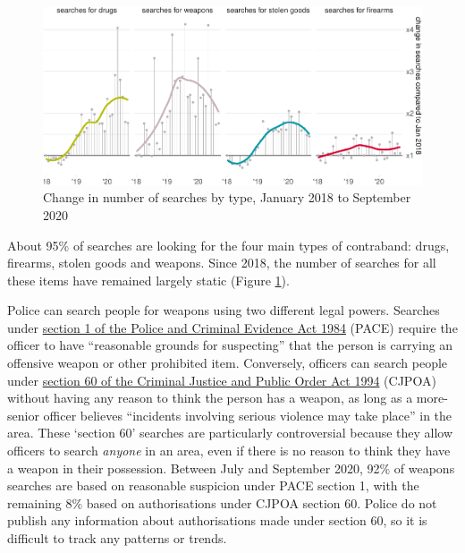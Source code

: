 \documentclass[
  a4paper,
  twoside, 11pt]{article}
\begin{document}
\begin{figure}[bh]

{\centering \includegraphics{2020-Q3_files/figure-latex/chart-search-types-change-1} 

}

\caption{Change in number of searches by type, January 2018 to September 2020}\label{fig:chart-search-types-change}
\end{figure}

About 95\% of searches are looking for the four main types of contraband: drugs, firearms, stolen goods and weapons. Since 2018, the number of searches for all these items have remained largely static (Figure \ref{fig:chart-search-types-change}).

Police can search people for weapons using two different legal powers. Searches under \href{https://www.legislation.gov.uk/ukpga/1984/60/section/1}{section 1 of the Police and Criminal Evidence Act 1984} (PACE) require the officer to have ``reasonable grounds for suspecting'' that the person is carrying an offensive weapon or other prohibited item. Conversely, officers can search people under \href{https://www.legislation.gov.uk/ukpga/1994/33/section/60}{section 60 of the Criminal Justice and Public Order Act 1994} (CJPOA) without having any reason to think the person has a weapon, as long as a more-senior officer believes ``incidents involving serious violence may take place'' in the area. These `section 60' searches are particularly controversial because they allow officers to search \emph{anyone} in an area, even if there is no reason to think they have a weapon in their possession. Between July and September 2020, 92\% of weapons searches are based on reasonable suspicion under PACE section 1, with the remaining 8\% based on authorisations under CJPOA section 60. Police do not publish any information about authorisations made under section 60, so it is difficult to track any patterns or trends.
\end{document}
